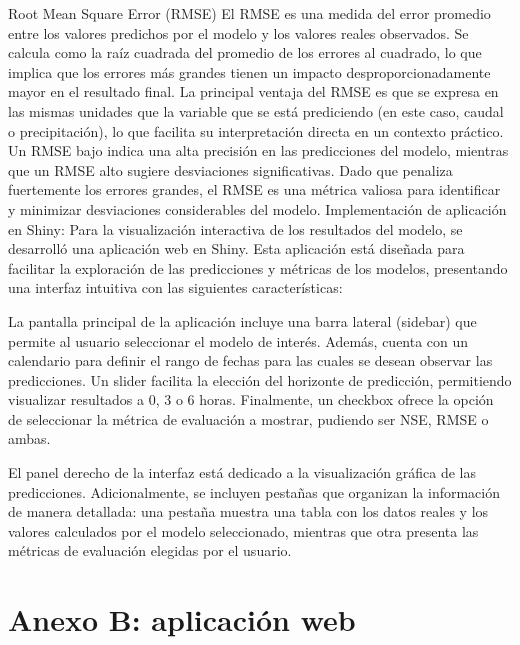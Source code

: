 \documentclass[hess, manuscript]{copernicus}
\begin{document}
Root Mean Square Error (RMSE)
El RMSE es una medida del error promedio entre los valores predichos por el modelo y los valores reales observados. Se calcula como la raíz cuadrada del promedio de los errores al cuadrado, lo que implica que los errores más grandes tienen un impacto desproporcionadamente mayor en el resultado final. La principal ventaja del RMSE es que se expresa en las mismas unidades que la variable que se está prediciendo (en este caso, caudal o precipitación), lo que facilita su interpretación directa en un contexto práctico. Un RMSE bajo indica una alta precisión en las predicciones del modelo, mientras que un RMSE alto sugiere desviaciones significativas. Dado que penaliza fuertemente los errores grandes, el RMSE es una métrica valiosa para identificar y minimizar desviaciones considerables del modelo.
Implementación de aplicación en Shiny:
Para la visualización interactiva de los resultados del modelo, se desarrolló una aplicación web en Shiny. Esta aplicación está diseñada para facilitar la exploración de las predicciones y métricas de los modelos, presentando una interfaz intuitiva con las siguientes características:

La pantalla principal de la aplicación incluye una barra lateral (sidebar) que permite al usuario seleccionar el modelo de interés. Además, cuenta con un calendario para definir el rango de fechas para las cuales se desean observar las predicciones. Un slider facilita la elección del horizonte de predicción, permitiendo visualizar resultados a 0, 3 o 6 horas. Finalmente, un checkbox ofrece la opción de seleccionar la métrica de evaluación a mostrar, pudiendo ser NSE, RMSE o ambas.

El panel derecho de la interfaz está dedicado a la visualización gráfica de las predicciones. Adicionalmente, se incluyen pestañas que organizan la información de manera detallada: una pestaña muestra una tabla con los datos reales y los valores calculados por el modelo seleccionado, mientras que otra presenta las métricas de evaluación elegidas por el usuario.



\section{Anexo B: aplicación web}
\end{document}
